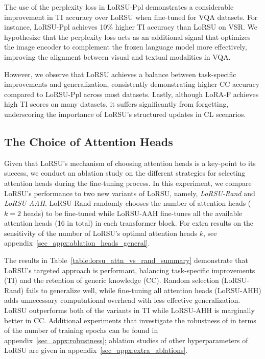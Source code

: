 The use of the perplexity loss in LoRSU-Ppl demonstrates a considerable improvement in TI accuracy over LoRSU when fine-tuned for VQA datasets. For instance, LoRSU-Ppl achieves 10\% higher TI accuracy than LoRSU on VSR. We hypothesize that the perplexity loss acts as an additional signal that optimizes the image encoder to complement the frozen language model more effectively, improving the alignment between visual and textual modalities in VQA.

However, we observe that LoRSU achieves a balance between task-specific improvements and generalization, consistently demonstrating higher CC accuracy compared to LoRSU-Ppl across most datasets. Lastly, although LoRA-F achieves high TI scores on many datasets, it suffers significantly from forgetting, underscoring the importance of LoRSU's structured updates in CL scenarios.


\subsection{The Choice of Attention Heads}

Given that LoRSU's mechanism of choosing attention heads is a key-point to its success, we conduct an ablation study on the different strategies for selecting attention heads during the fine-tuning process. In this experiment, we compare LoRSU's performance to two new variants of LoRSU, namely, \emph{LoRSU-Rand} and \emph{LoRSU-AAH}. LoRSU-Rand randomly chooses the number of attention heads ($k=2$ heads) to be fine-tuned while LoRSU-AAH fine-tunes all the available attention heads (16 in total) in each transformer block. For extra results on the sensitivity of the number of LoRSU's optimal attention heads $k$, see appendix~\ref{sec_appx:ablation_heads_general}.

The results in Table~\ref{table:lorsu_attn_vs_rand_summary} demonstrate that  LoRSU's targeted approach is performant, balancing task-specific improvements (TI) and the retention of generic knowledge (CC).
Random selection (LoRSU-Rand) fails to generalize well, while fine-tuning all attention heads (LoRSU-AHH) adds unnecessary computational overhead with less effective generalization. LoRSU outperforms both of the variants in TI while LoRSU-AHH is marginally better in CC. Additional experiments that investigate the robustness of \ours in terms of the number of training epochs can be found in appendix~\ref{sec_appx:robustness}; ablation studies of other hyperparameters of LoRSU are given in appendix~\ref{sec_appx:extra_ablations}.


